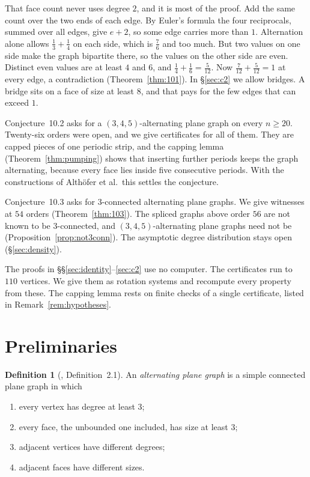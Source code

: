 \documentclass[11pt,a4paper]{amsart}
\theoremstyle{plain}
\theoremstyle{definition}
\newtheorem{definition}[theorem]{Definition}
\begin{document}
That face count never uses degree $2$, and it is most of the proof. Add the same
count over the two ends of each edge. By Euler's formula the four reciprocals,
summed over all edges, give $e+2$, so some edge carries more than $1$. Alternation alone allows
$\frac13+\frac14$ on each side, which is $\frac76$ and too much. But two
values on one side make the graph bipartite there, so the values on the other
side are even. Distinct even values are at least $4$ and $6$, and
$\frac14+\frac16=\frac5{12}$. Now $\frac7{12}+\frac5{12}=1$ at every edge, a
contradiction (Theorem~\ref{thm:101}). In \S\ref{sec:c2} we allow bridges. A
bridge sits on a face of size at least $8$, and that pays for the few edges that
can exceed $1$.

Conjecture~10.2 asks for a $(3,4,5)$-alternating plane graph on every
$n \ge 20$. Twenty-six orders were open, and we give certificates for all of
them. They are capped pieces of one periodic strip, and the capping lemma
(Theorem~\ref{thm:pumping}) shows that inserting further periods keeps the graph
alternating, because every face lies inside five consecutive periods. With the
constructions of Alth\"ofer et al.\ this settles the conjecture.

Conjecture~10.3 asks for $3$-connected alternating plane graphs. We give
witnesses at $54$ orders (Theorem~\ref{thm:103}). The spliced graphs above
order $56$ are not known to be $3$-connected, and $(3,4,5)$-alternating plane
graphs need not be (Proposition~\ref{prop:not3conn}). The asymptotic degree
distribution stays open (\S\ref{sec:density}).

The proofs in \S\S\ref{sec:identity}--\ref{sec:c2} use no computer. The
certificates run to $110$ vertices. We give them as rotation systems and
recompute every property from these. The capping lemma rests on finite checks
of a single certificate, listed in Remark~\ref{rem:hypotheses}.

\section{Preliminaries}\label{sec:prelim}

\begin{definition}[\cite{AHSSV2015}, Definition~2.1]\label{def:apg}
An \emph{alternating plane graph} is a simple connected plane graph in
which
\begin{enumerate}
  \item[(a)] every vertex has degree at least $3$;
  \item[(b)] every face, the unbounded one included, has size at least $3$;
  \item[(c)] adjacent vertices have different degrees;
  \item[(d)] adjacent faces have different sizes.
\end{enumerate}
\end{definition}
\end{document}
